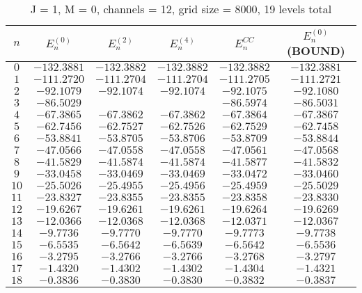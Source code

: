 \documentclass[12pt]{article}
\newcommand{\rred}{\color{red}}
\begin{document}
\begin{table}[H]
    \centering
    \caption{J = 1, M = 0, channels = 12, grid size = 8000, 19 levels total}
    \begin{tabular}{cccccc}
        \toprule
        $n$ & $E_n^{(0)}$ & $E_n^{(2)}$ & $E_n^{(4)}$ & $E_n^{CC}$ & $E_n^{(0)}$(BOUND) \\
        \midrule
          $0$  & $-132.3881$ & $-132.3882$ & $-132.3882$ & $-132.3882$ & $-132.3881$ \\ 
          $1$  & $-111.2720$ & $-111.2704$ & $-111.2704$ & $-111.2705$ & $-111.2721$ \\
          $2$  & $-92.1079 $ & $-92.1074 $ & $-92.1074 $ & $-92.1075$  & $-92.1080 $ \\         
          $3$  & $-86.5029 $ & \rred{$-86.4459$} & \rred{$-86.5020$} & $-86.5974$  & $-86.5031 $ \\     
          $4$  & $-67.3865 $ & $-67.3862 $ & $-67.3862 $ & $-67.3864$  & $-67.3867 $ \\ 
          $5$  & $-62.7456 $ & $-62.7527 $ & $-62.7526 $ & $-62.7529$  & $-62.7458 $ \\ 
          $6$  & $-53.8841 $ & $-53.8705 $ & $-53.8706 $ & $-53.8709$  & $-53.8844 $ \\ 
          $7$  & $-47.0566 $ & $-47.0558 $ & $-47.0558 $ & $-47.0561$  & $-47.0568 $ \\ 
          $8$  & $-41.5829 $ & $-41.5874 $ & $-41.5874 $ & $-41.5877$  & $-41.5832 $ \\ 
          $9$  & $-33.0458 $ & $-33.0469 $ & $-33.0469 $ & $-33.0472$  & $-33.0460 $ \\ 
          $10$ & $-25.5026 $ & $-25.4955 $ & $-25.4956 $ & $-25.4959$  & $-25.5029 $ \\  
          $11$ & $-23.8327 $ & $-23.8355 $ & $-23.8355 $ & $-23.8358$  & $-23.8330 $ \\
          $12$ & $-19.6267 $ & $-19.6261 $ & $-19.6261 $ & $-19.6264$  & $-19.6269 $ \\
          $13$ & $-12.0366 $ & $-12.0368 $ & $-12.0368 $ & $-12.0371$  & $-12.0367 $ \\  
          $14$ & $-9.7736  $ & $-9.7770  $ & $-9.7770  $ & $-9.7773 $  & $-9.7738  $ \\  
          $15$ & $-6.5535  $ & $-6.5642  $ & $-6.5639  $ & $-6.5642 $  & $-6.5536  $ \\
          $16$ & $-3.2795  $ & $-3.2766  $ & $-3.2766  $ & $-3.2768 $  & $-3.2797  $ \\ 
          $17$ & $-1.4320  $ & $-1.4302  $ & $-1.4302  $ & $-1.4304 $  & $-1.4321  $ \\
          $18$ & $-0.3836  $ & $-0.3830  $ & $-0.3830  $ & $-0.3832 $  & $-0.3837  $ \\
       \bottomrule
    \end{tabular}
\end{table}
\end{document}
